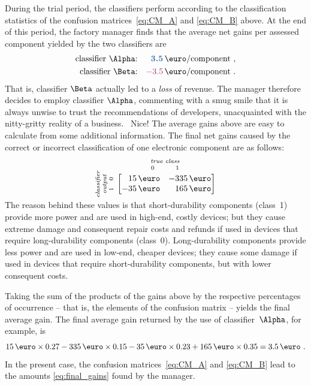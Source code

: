 \documentclass[\ifafour a4paper,12pt,\else a5paper,10pt,\fi%
onecolumn,oneside,article,%
british%
]{memoir}
\theoremstyle{remark}
\theoremstyle{innote}
\newcommand*{\wrench}{{\fontencoding{U}\fontfamily{fontawesomethree}\selectfont\symbol{114}}}
\newcommand{\mynotew}[1]{{\footnotesize\color{notecolour}\wrench\ #1}}
\renewcommand*{\|}[1][]{\nonscript\:#1\vert\nonscript\:\mathopen{}}
\newcommand*{\good}[1]{\ensuremath{{\color{mypurpleblue}\bm{#1}}}}
\newcommand*{\bad}[1]{\ensuremath{{\color{myredpurple}#1}}}
\begin{document}
During the trial period, the classifiers perform according to the classification statistics of the confusion matrices~\eqref{eq:CM_A} and \eqref{eq:CM_B} above. At the end of this period, the factory manager finds that the average net gains per assessed component yielded by the two classifiers are
\begin{equation}
  \label{eq:final_gains}
\begin{aligned}
  \text{classifier $\Alpha$:}& & \good{3.5}\,\text{\texteuro/component}&\ , \\
  \text{classifier $\Beta$:}& &\bad{-3.5}\,\text{\texteuro/component}&\ .
\end{aligned}
\end{equation}
That is, classifier $\Beta$ actually led to a \emph{loss} of revenue. The manager therefore decides to employ classifier $\Alpha$, commenting with a smug smile that it is always unwise to trust the recommendations of developers, unacquainted with the nitty-gritty reality of a business.
\mynotew{Nice!}
The average gains above are easy to calculate from some additional information. The final net gains caused by the correct or incorrect classification of one electronic component are as follows:
\begin{equation}
  \label{eq:utility_example}
  \rotatebox[origin=c]{90}{
    \clap{\textit{\parbox{5em}{\centering\scriptsize classifier\\output\\$1\quad 0$}}
    }}\ 
    \overbracket[0pt]{
      \begin{bmatrix*}[r]
        15\,\text{\texteuro} & -335\,\text{\texteuro}  \\
        -35\,\text{\texteuro} & 165\,\text{\texteuro}
      \end{bmatrix*}}^{
      \clap{\textit{\parbox{6em}{\centering\scriptsize true class\\$0\hspace{3em}1$}}
    }}
\end{equation}
The reason behind these values is that short-durability components (class~1) provide more power and are used in high-end, costly devices; but they cause extreme damage and consequent repair costs and refunds if used in devices that require long-durability components (class~0). Long-durability components provide less power and are used in low-end, cheaper devices; they cause some damage if used in devices that require short-durability components, but with lower consequent costs.

Taking the sum of the products of the gains above by the respective percentages of occurrence -- that is, the elements of the confusion matrix -- yields the final average gain. The final average gain returned by the use of classifier~$\Alpha$, for example, is
\begin{equation*}
  15\,\text{\texteuro} \times 0.27 
  -335\,\text{\texteuro} \times 0.15 
  -35\,\text{\texteuro} \times 0.23 
  + 165\,\text{\texteuro} \times 0.35 =
  3.5 \,\text{\texteuro} \ .
\end{equation*}
In the present case, the confusion matrices~\eqref{eq:CM_A} and \eqref{eq:CM_B} lead to the amounts \eqref{eq:final_gains} found by the manager.
\end{document}

